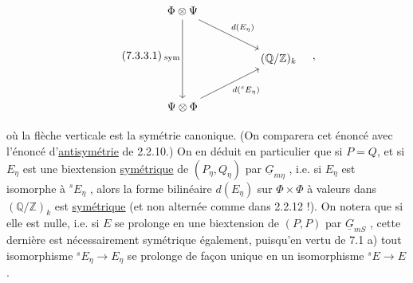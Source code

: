 \begin{equation}\tag{7.3.3.1}
\begin{tikzcd}[row sep=large, column sep=huge]
\Phi \otimes \Psi \arrow[dd, "\mathrm{sym}"'] \arrow[rd, "d(E_\eta)"] & \\
 & (\mathbb{Q}/\mathbb{Z})_k \\
\Psi \otimes \Phi \arrow[ru, "d({}^{s}E_\eta)"'] &
\end{tikzcd}\quad ,
\end{equation}

où la flèche verticale est la symétrie canonique. (On comparera cet énoncé avec l'énoncé d'\underline{antisymétrie} de 2.2.10.) On en déduit en particulier que si $P=Q$, et si $E_\eta$ est une biextension \underline{symétrique} de $(P_\eta , Q_\eta)$ par $\underline{G}_{m\eta}$ , i.e. si $E_\eta$ est isomorphe à ${}^{s}E_\eta$ , alors la forme bilinéaire $d(E_\eta)$ sur $\Phi \times \Phi$ à valeurs dans $(\mathbb{Q}/\mathbb{Z})_k$ est \underline{symétrique} (et non alternée comme dans 2.2.12 !). On notera que si elle est nulle, i.e. si $E$ se prolonge en une biextension de $(P,P)$ par $\underline{G}_{mS}$ , cette dernière est nécessairement symétrique également, puisqu'en vertu de 7.1 a) tout isomorphisme ${}^{s}E_\eta \longrightarrow E_\eta$ se prolonge de façon unique en un isomorphisme ${}^{s}E \longrightarrow E$ .



